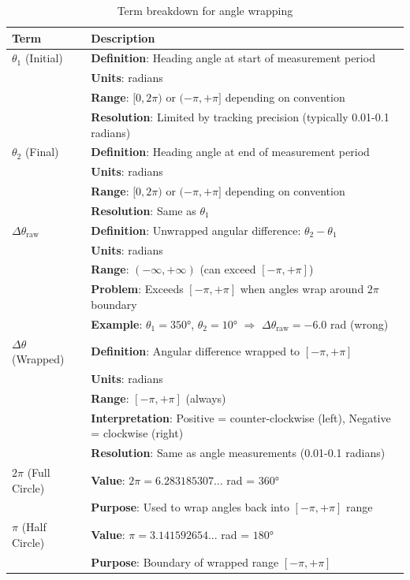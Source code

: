 \documentclass[
  11pt,
]{article}
\begin{document}
\begin{table}[H]
\centering
\footnotesize
\begin{tabular}{p{3cm}p{11cm}}
\hline
\textbf{Term} & \textbf{Description} \\
\hline
$\theta_1$ (Initial) & \textbf{Definition}: Heading angle at start of measurement period \\
 & \textbf{Units}: radians \\
 & \textbf{Range}: $[0, 2\pi)$ or $(-\pi, +\pi]$ depending on convention \\
 & \textbf{Resolution}: Limited by tracking precision (typically 0.01-0.1 radians) \\
\hline
$\theta_2$ (Final) & \textbf{Definition}: Heading angle at end of measurement period \\
 & \textbf{Units}: radians \\
 & \textbf{Range}: $[0, 2\pi)$ or $(-\pi, +\pi]$ depending on convention \\
 & \textbf{Resolution}: Same as $\theta_1$ \\
\hline
$\Delta\theta_{\text{raw}}$ & \textbf{Definition}: Unwrapped angular difference: $\theta_2 - \theta_1$ \\
 & \textbf{Units}: radians \\
 & \textbf{Range}: $(-\infty, +\infty)$ (can exceed $[-\pi, +\pi]$) \\
 & \textbf{Problem}: Exceeds $[-\pi, +\pi]$ when angles wrap around $2\pi$ boundary \\
 & \textbf{Example}: $\theta_1 = 350°$, $\theta_2 = 10°$ $\Rightarrow$ $\Delta\theta_{\text{raw}} = -6.0$ rad (wrong) \\
\hline
$\Delta\theta$ (Wrapped) & \textbf{Definition}: Angular difference wrapped to $[-\pi, +\pi]$ \\
 & \textbf{Units}: radians \\
 & \textbf{Range}: $[-\pi, +\pi]$ (always) \\
 & \textbf{Interpretation}: Positive = counter-clockwise (left), Negative = clockwise (right) \\
 & \textbf{Resolution}: Same as angle measurements (0.01-0.1 radians) \\
\hline
$2\pi$ (Full Circle) & \textbf{Value}: $2\pi = 6.283185307...$ rad = $360°$ \\
 & \textbf{Purpose}: Used to wrap angles back into $[-\pi, +\pi]$ range \\
\hline
$\pi$ (Half Circle) & \textbf{Value}: $\pi = 3.141592654...$ rad = $180°$ \\
 & \textbf{Purpose}: Boundary of wrapped range $[-\pi, +\pi]$ \\
\hline
\end{tabular}
\caption{Term breakdown for angle wrapping}

\end{table}
\end{document}
